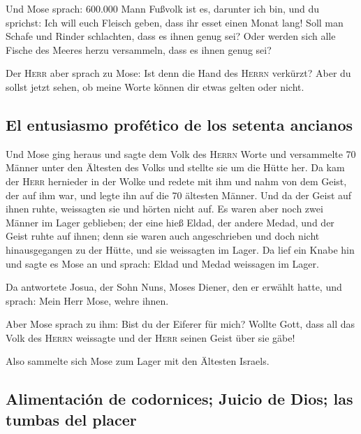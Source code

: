 Und Mose sprach: 600.000 Mann Fußvolk ist es, darunter
ich bin, und du sprichst: Ich will euch Fleisch geben, dass ihr esset
einen Monat lang!  Soll man Schafe und Rinder schlachten,
dass es ihnen genug sei? Oder werden sich alle Fische des Meeres herzu
versammeln, dass es ihnen genug sei?

 Der \textsc{Herr} aber sprach zu Mose: Ist denn die Hand
des \textsc{Herrn} verkürzt? Aber du sollst jetzt sehen, ob meine Worte
können dir etwas gelten oder nicht.

\hypertarget{el-entusiasmo-profuxe9tico-de-los-setenta-ancianos}{%
\subsection{El entusiasmo profético de los setenta
ancianos}\label{el-entusiasmo-profuxe9tico-de-los-setenta-ancianos}}

 Und Mose ging heraus und sagte dem Volk des
\textsc{Herrn} Worte und versammelte 70 Männer unter den Ältesten des
Volks und stellte sie um die Hütte her.  Da kam der
\textsc{Herr} hernieder in der Wolke und redete mit ihm und nahm von dem
Geist, der auf ihm war, und legte ihn auf die 70 ältesten Männer. Und da
der Geist auf ihnen ruhte, weissagten sie und hörten nicht auf.
 Es waren aber noch zwei Männer im Lager geblieben; der
eine hieß Eldad, der andere Medad, und der Geist ruhte auf ihnen; denn
sie waren auch angeschrieben und doch nicht hinausgegangen zu der Hütte,
und sie weissagten im Lager.  Da lief ein Knabe hin und
sagte es Mose an und sprach: Eldad und Medad weissagen im Lager.

 Da antwortete Josua, der Sohn Nuns, Moses Diener, den er
erwählt hatte, und sprach: Mein Herr Mose, wehre ihnen.

 Aber Mose sprach zu ihm: Bist du der Eiferer für mich?
Wollte Gott, dass all das Volk des \textsc{Herrn} weissagte und der
\textsc{Herr} seinen Geist über sie gäbe!

 Also sammelte sich Mose zum Lager mit den Ältesten
Israels.

\hypertarget{alimentaciuxf3n-de-codornices-juicio-de-dios-las-tumbas-del-placer}{%
\subsection{Alimentación de codornices; Juicio de Dios; las tumbas del
placer}\label{alimentaciuxf3n-de-codornices-juicio-de-dios-las-tumbas-del-placer}}

